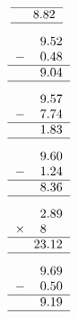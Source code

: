 \documentclass[leqno, 12pt]{article}
\begin{document}
\begin{multicols}{3}
\begin{equation}
{\begin{tabular}{c S[table-format=1.2]}
        \hline
         &8.82 \tabularnewline
        \hline
    \end{tabular}}
\end{equation}
\vspace{-1pt}%
\begin{equation}
    \raisebox{-0.8cm}{
        \begin{tabular}{c S[table-format=1.2]}
         &9.52 \tabularnewline
        $-$&0.48 \tabularnewline
        \hline
         &9.04 \tabularnewline
        \hline
    \end{tabular}}
\end{equation}
\vspace{-1pt}%
\begin{equation}
    \raisebox{-0.8cm}{
        \begin{tabular}{c S[table-format=1.2]}
         &9.57 \tabularnewline
        $-$&7.74 \tabularnewline
        \hline
         &1.83 \tabularnewline
        \hline
    \end{tabular}}
\end{equation}
\vspace{-1pt}%
\begin{equation}
    \raisebox{-0.8cm}{
        \begin{tabular}{c S[table-format=1.2]}
         &9.60 \tabularnewline
        $-$&1.24 \tabularnewline
        \hline
         &8.36 \tabularnewline
        \hline
    \end{tabular}}
\end{equation}
\vspace{-1pt}%
\begin{equation}
    \raisebox{-0.8cm}{
        \begin{tabular}{c S[table-format=1.2]}
         &2.89 \tabularnewline
        $\times$&8 \tabularnewline
        \hline
         &23.12 \tabularnewline
        \hline
    \end{tabular}}
\end{equation}
\vspace{-1pt}%
\begin{equation}
    \raisebox{-0.8cm}{
        \begin{tabular}{c S[table-format=1.2]}
         &9.69 \tabularnewline
        $-$&0.50 \tabularnewline
        \hline
         &9.19 \tabularnewline
        \hline
    \end{tabular}}
\end{equation}
\vspace{-1pt}%

\end{multicols}
\end{document}
